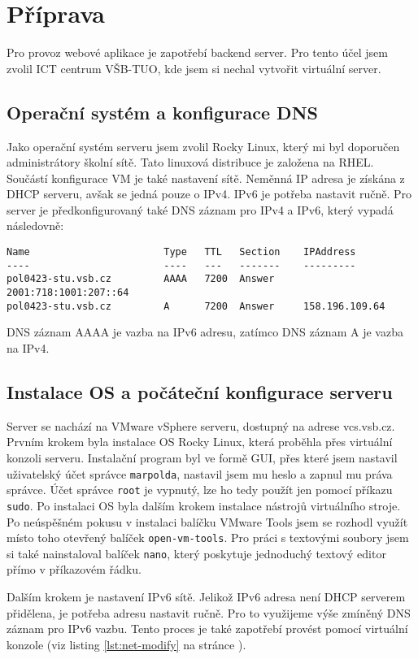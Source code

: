 \chapter{Příprava}
Pro provoz webové aplikace je zapotřebí backend server.
Pro tento účel jsem zvolil ICT centrum VŠB-TUO, kde jsem si nechal
vytvořit virtuální server.

\section{Operační systém a konfigurace DNS}
Jako operační systém serveru jsem zvolil Rocky Linux,
který mi byl doporučen administrátory školní sítě. Tato linuxová
distribuce je založena na RHEL. Součástí konfigurace VM je také
nastavení sítě. Neměnná IP adresa je získána z DHCP serveru,
avšak se jedná pouze o IPv4. IPv6 je potřeba nastavit ručně.
Pro server je předkonfigurovaný také DNS záznam pro IPv4 a IPv6,
který vypadá následovně:

\begin{verbatim}
Name                       Type   TTL   Section    IPAddress
----                       ----   ---   -------    ---------
pol0423-stu.vsb.cz         AAAA   7200  Answer     2001:718:1001:207::64
pol0423-stu.vsb.cz         A      7200  Answer     158.196.109.64
\end{verbatim}

DNS záznam AAAA je vazba na IPv6 adresu, zatímco DNS záznam A
je vazba na IPv4.

\section{Instalace OS a počáteční konfigurace serveru}
Server se nachází na VMware vSphere serveru, dostupný
na adrese vcs.vsb.cz. Prvním krokem byla instalace OS Rocky Linux,
která proběhla přes virtuální konzoli serveru. Instalační program
byl ve formě GUI, přes které jsem nastavil uživatelský účet správce
\texttt{marpolda}, nastavil jsem mu heslo a zapnul mu práva správce.
Účet správce \texttt{root} je vypnutý, lze ho tedy použít jen pomocí
příkazu \texttt{sudo}. Po instalaci OS byla dalším krokem instalace
nástrojů virtuálního stroje. Po neúspěšném pokusu v instalaci balíčku
VMware Tools jsem se rozhodl využít místo toho otevřený balíček
\texttt{open-vm-tools}. Pro práci s textovými soubory jsem si
také nainstaloval balíček \texttt{nano}, který poskytuje jednoduchý
textový editor přímo v příkazovém řádku.

Dalším krokem je nastavení IPv6 sítě. Jelikož IPv6 adresa není
DHCP serverem přidělena, je potřeba adresu nastavit ručně. Pro to
využijeme výše zmíněný DNS záznam pro IPv6 vazbu. Tento proces
je také zapotřebí provést pomocí virtuální konzole (viz listing
\ref{lst:net-modify} na stránce \pageref{lst:net-modify}).

